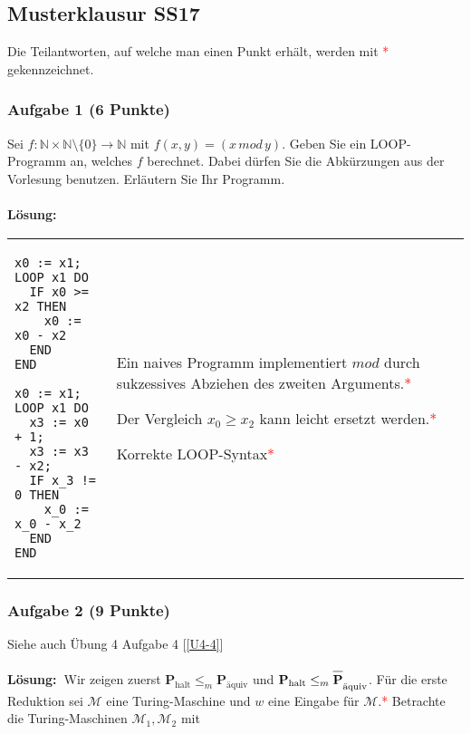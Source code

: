 \documentclass[a4paper,10pt]{article}
\newcommand{\f}[1]{\textbf{#1}}
\newcommand{\LOES}{\f{Lösung:~}}
\newcommand{\prob}[1]{\textbf{#1}}
\newcommand{\prspec}[1]{\prob{P}_{\text{#1}}}
\newcommand{\phalt}{\prspec{halt}}
\newcommand{\paq}{\prspec{äquiv}}
\newcommand{\N}{\mathbb{N}}
\begin{document}
\newcommand{\copaq}{\overline{\mbox{\prob{P}\strut}}_{\text{äquiv}}}
\newcommand{\M}{\mathcal{M}}
\newcommand{\POINT}{{\textcolor{red}{* }}}
\subsection*{Musterklausur SS17}
Die Teilantworten, auf welche man einen Punkt erhält, werden mit \POINT gekennzeichnet.
\subsubsection*{Aufgabe 1 (6 Punkte)}
Sei $f: \N \times \N \setminus \{0\} \to \N$ mit $f(x,y)=(x\,mod\,y)$. Geben Sie ein LOOP-Programm an, welches $f$ berechnet. Dabei dürfen Sie die Abkürzungen aus der Vorlesung benutzen. Erläutern Sie Ihr Programm. \\\\
\LOES \\
\begin{tabular}{p{} p{}}
\begin{lstlisting}
x0 := x1;
LOOP x1 DO  
  IF x0 >= x2 THEN
    x0 := x0 - x2
  END
END
\end{lstlisting}
\begin{lstlisting}
x0 := x1;
LOOP x1 DO  
  x3 := x0 + 1;
  x3 := x3 - x2;
  IF x_3 != 0 THEN
    x_0 := x_0 - x_2
  END
END
\end{lstlisting}
& 
\vspace{1.5cm}
Ein naives Programm implementiert $mod$ durch sukzessives Abziehen des zweiten Arguments.\POINT \newline

Der Vergleich $x_0 \geq x_2$ kann leicht ersetzt werden.\POINT \newline

Korrekte LOOP-Syntax\POINT

\end{tabular}

\subsubsection*{Aufgabe 2 (9 Punkte)}
\label{MUSTER-2}
Siehe auch Übung 4 Aufgabe 4 [\ref{U4-4}] \\\\
\LOES Wir zeigen zuerst $\phalt \leq_m \paq$ und $\phalt \leq_m \copaq$. Für die erste Reduktion sei $\M$ eine Turing-Maschine und $w$ eine Eingabe für $\M$.\POINT Betrachte die Turing-Maschinen $\M_1,\M_2$ mit \\
\end{document}
